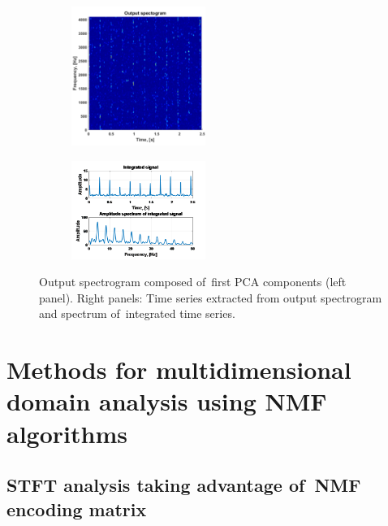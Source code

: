 \begin{figure}[!ht]
 \centering
 \begin{subfigure}
   \centering
   \includegraphics[width=0.48\textwidth]{wykresy/pca_outspec.png}
 \end{subfigure}
 \begin{subfigure}
   \centering
		\includegraphics[width=0.48\textwidth,height=0.48\textwidth]{wykresy/pca_outts.png}
 \end{subfigure}
 \caption{Output spectrogram composed of~first PCA components (left panel). Right panels: Time series extracted from output spectrogram and spectrum of~integrated time series.}
 \label{fig: pca_out}
\end{figure}


\clearpage
\section{Methods for multidimensional domain analysis using NMF algorithms}

\subsection{STFT analysis taking advantage of~NMF encoding matrix}\label{result_enc}

